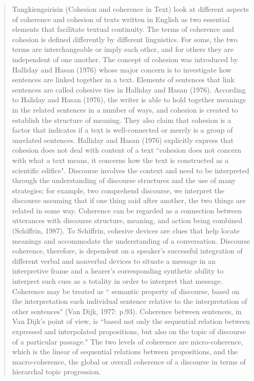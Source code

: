 \begin{quotation}
Tangkiengsirisin (Cohesion and coherence in Text) look at different aspects of coherence and cohesion of texts written in English as two essential elements that facilitate textual continuity. 
The terms of coherence and cohesion is defined differently by different linguistics. 
For some, the two terms are interchangeable or imply each other, and for others they are independent of one another. 
The concept of cohesion was introduced by Halliday and Hasan (1976) whose major concern is to investigate how sentences are linked together in a text. 
Elements of sentences that link sentences are called cohesive ties in Halliday and Hasan (1976). 
According to Haliday and Hasan (1976), the writer is able to hold together meanings in the related sentences in a number of ways, and cohesion is created to establish the structure of meaning. 
They also claim that cohesion is a factor that indicates if a text is well-connected or merely is a group of unrelated sentences. 
Halliday and Hasan (1976) explicitly express that cohesion does not deal with content of a text
``cohesion does not concern with what a text means, it concerns how the text is constructed as a scientific edifice". 
Discourse involves the context and need to be interpreted through the understanding of discourse structures and the use of many strategies; for example, two comprehend discourse, we interpret the discourse assuming that if one thing said after another, the two things are related in some way. 
Coherence can be regarded as a connection between utterances with discourse structure, meaning, and action being combined (Schiffrin, 1987). 
To Schiffrin, cohesive devices are clues that help locate meanings and accommodate the understanding of a conversation. 
Discourse coherence, therefore, is dependent on a speaker's successful integration of different verbal and nonverbal devices to situate a message in an interpretive frame and a hearer's corresponding synthetic ability to interpret such cues as a totality in order to interpret that message. 
Coherence may be treated as `` semantic property of discourse, based on the interpretation each individual sentence relative to the interpretation of other sentences" (Van Dijk, 1977: p.93). 
Coherence between sentences, in Van Dijk's point of view, is ``based not only the sequential relation between expressed and interpolated propositions, but also on the topic of discourse of a particular passage."
The two levels of coherence are micro-coherence, which is the linear of sequential relations between propositions, and the macro-coherence, the global or overall coherence of a discourse in terms of hierarchal topic progression. 

\end{quotation}
